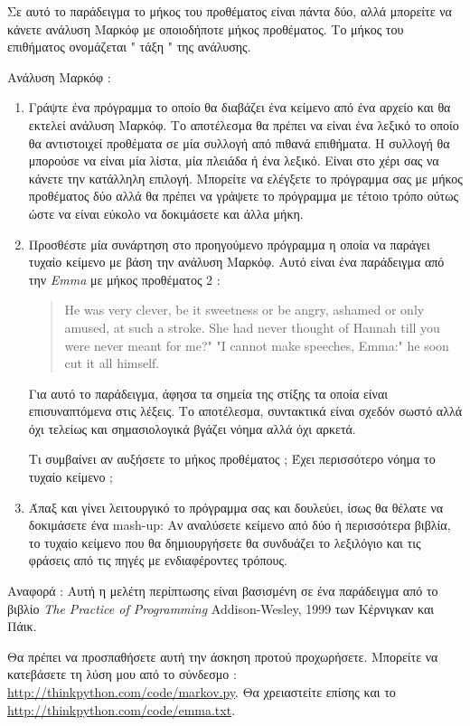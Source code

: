 \documentclass[10pt]{book}
\begin{document}
 Σε αυτό το παράδειγμα το μήκος του προθέματος είναι πάντα δύο, αλλά μπορείτε να κάνετε ανάλυση Μαρκόφ με οποιοδήποτε μήκος προθέματος. Το μήκος του επιθήματος ονομάζεται  " τάξη "  της ανάλυσης.

\begin{exercise}

Ανάλυση Μαρκόφ :

\begin{enumerate}

\item  Γράψτε ένα πρόγραμμα το οποίο θα διαβάζει ένα κείμενο από ένα αρχείο και θα εκτελεί ανάλυση Μαρκόφ. 
Το αποτέλεσμα θα πρέπει να είναι ένα λεξικό το οποίο θα αντιστοιχεί προθέματα σε μία συλλογή από πιθανά επιθήματα. 
Η συλλογή θα μπορούσε να είναι μία λίστα, μία πλειάδα ή ένα λεξικό. Είναι στο χέρι σας να κάνετε την κατάλληλη επιλογή. 
Μπορείτε να ελέγξετε το πρόγραμμα σας με μήκος προθέματος δύο αλλά θα πρέπει να γράψετε το πρόγραμμα με τέτοιο τρόπο ούτως 
ώστε να είναι εύκολο να δοκιμάσετε και άλλα μήκη. 

\item  Προσθέστε μία συνάρτηση στο προηγούμενο πρόγραμμα η οποία να παράγει τυχαίο κείμενο με βάση την ανάλυση Μαρκόφ. 
Αυτό είναι ένα παράδειγμα από την  {\em Emma}  με μήκος προθέματος 2 :

\begin{quote}
He was very clever, be it sweetness or be angry, ashamed or only
amused, at such a stroke. She had never thought of Hannah till you
were never meant for me?" "I cannot make speeches, Emma:" he soon cut
it all himself.
\end{quote}

 Για αυτό το παράδειγμα, άφησα τα σημεία της στίξης τα οποία είναι επισυναπτόμενα στις λέξεις. Το αποτέλεσμα, συντακτικά είναι σχεδόν σωστό αλλά όχι τελείως και σημασιολογικά βγάζει νόημα αλλά όχι αρκετά. 

Τι συμβαίνει αν αυξήσετε το μήκος προθέματος ;  Έχει περισσότερο νόημα το τυχαίο κείμενο ;

\item  Άπαξ και γίνει λειτουργικό το πρόγραμμα σας και δουλεύει, ίσως θα θέλατε να δοκιμάσετε ένα  mash-up: 
 Αν αναλύσετε κείμενο από δύο ή περισσότερα βιβλία, το τυχαίο κείμενο που θα δημιουργήσετε θα συνδυάζει το λεξιλόγιο 
και τις φράσεις από τις πηγές με ενδιαφέροντες τρόπους.

\end{enumerate}

 Αναφορά :  Αυτή η μελέτη περίπτωσης είναι βασισμένη σε ένα παράδειγμα από το βιβλίο  {\em The Practice of Programming} Addison-Wesley, 1999  των Κέρνιγκαν και Πάικ.

Θα πρέπει να προσπαθήσετε αυτή την άσκηση προτού προχωρήσετε. Μπορείτε να κατεβάσετε τη λύση μου από το σύνδεσμο : \url{http://thinkpython.com/code/markov.py}.  Θα χρειαστείτε επίσης και το  \url{http://thinkpython.com/code/emma.txt}.
\end{exercise}
\end{document}
